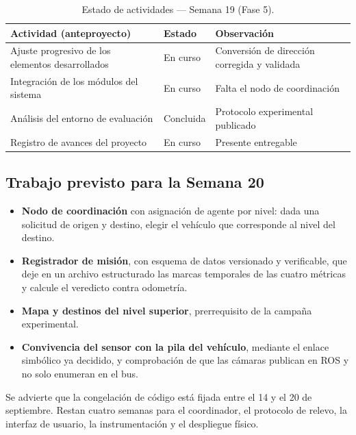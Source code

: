 \documentclass[12pt,letterpaper]{article}
\begin{document}
\begin{table}[H]
    \centering
    \small
    \caption{Estado de actividades --- Semana 19 (Fase 5).}
    \label{tab:estado_s19}
    \begin{tabular}{@{}p{6.3cm}ll@{}}
        \toprule
        \textbf{Actividad (anteproyecto)} & \textbf{Estado} & \textbf{Observación} \\ \midrule
        Ajuste progresivo de los elementos desarrollados & En curso & Conversión de dirección corregida y validada \\ \addlinespace
        Integración de los módulos del sistema & En curso & Falta el nodo de coordinación \\ \addlinespace
        Análisis del entorno de evaluación & Concluida & Protocolo experimental publicado \\ \addlinespace
        Registro de avances del proyecto & En curso & Presente entregable \\ \bottomrule
    \end{tabular}
\end{table}

\subsection{Trabajo previsto para la Semana 20}

\begin{itemize}
    \item \textbf{Nodo de coordinación} con asignación de agente por nivel: dada una solicitud de origen y destino, elegir el vehículo que corresponde al nivel del destino.
    \item \textbf{Registrador de misión}, con esquema de datos versionado y verificable, que deje en un archivo estructurado las marcas temporales de las cuatro métricas y calcule el veredicto contra odometría.
    \item \textbf{Mapa y destinos del nivel superior}, prerrequisito de la campaña experimental.
    \item \textbf{Convivencia del sensor con la pila del vehículo}, mediante el enlace simbólico ya decidido, y comprobación de que las cámaras publican en ROS y no solo enumeran en el bus.
\end{itemize}

Se advierte que la congelación de código está fijada entre el 14 y el 20 de septiembre. Restan cuatro semanas para el coordinador, el protocolo de relevo, la interfaz de usuario, la instrumentación y el despliegue físico.
\end{document}
